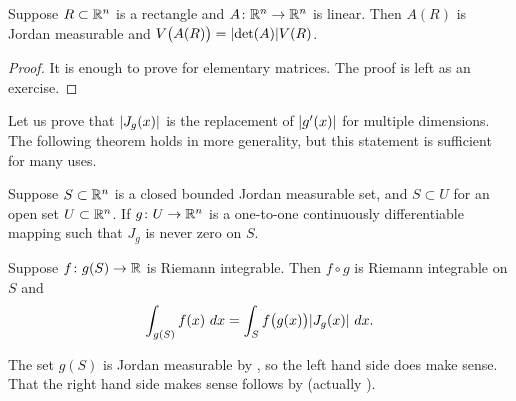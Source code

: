 \begin{prop} \label{prop:volrectdet}
Suppose $R \subset {\mathbb{R}}^n$ is a rectangle
and $A \colon {\mathbb{R}}^n \to {\mathbb{R}}^n$ is linear.  Then
$A(R)$ is Jordan measurable and $V\bigl(A(R)\bigr) = \lvert {\det (A)} \rvert V(R)$.
\end{prop}

\begin{proof}
It is enough to prove for elementary matrices.  The proof is left as an
exercise.
\end{proof}

Let us prove that
$\lvert {J_g(x)} \rvert$ is the replacement of $\lvert {g'(x)} \rvert$ for multiple
dimensions.  The following theorem holds in more generality,
but this statement is sufficient for many uses.

\begin{thm}
Suppose $S \subset {\mathbb{R}}^n$ is a closed bounded Jordan measurable set,
and $S \subset U$ for an open set $U \subset {\mathbb{R}}^n$.  If
$g \colon U \to {\mathbb{R}}^n$ is a one-to-one
continuously differentiable mapping such that
$J_g$ is never zero on $S$.

Suppose $f \colon g(S) \to {\mathbb{R}}$ is Riemann
integrable.  Then $f \circ g$ is Riemann integrable on $S$ and
\begin{equation*}
\int_{g(S)} f(x) ~ dx = 
\int_S f\bigl(g(x)\bigr) \lvert {J_g(x)} \rvert ~ dx .
\end{equation*}
\end{thm}

The set $g(S)$ is Jordan measurable by ,
so the left hand side does make sense.
That the right hand side makes sense follows by
 (actually
).

